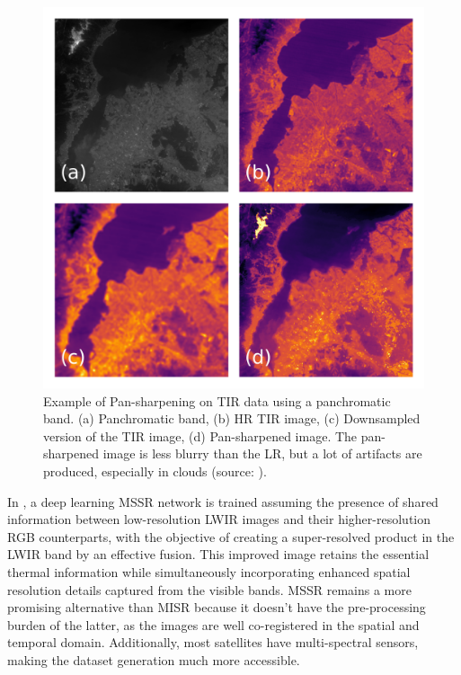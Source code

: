         \begin{figure}[H]
            \centering
            \includegraphics[scale=0.9]{Includes/2-pansharpen.png}
            \caption{Example of Pan-sharpening on TIR data using a panchromatic band. (a) Panchromatic band, (b) HR TIR image, (c) Downsampled version of the TIR image, (d) Pan-sharpened image. 
            The pan-sharpened image is less blurry than the LR, but a lot of artifacts are produced, especially in clouds (source: \cite{myself2023}).}
            \label{fig:2-pansharpening}
        \end{figure}

        In \cite{myself2023}, a deep learning MSSR network is trained assuming the presence of shared information between low-resolution LWIR images and their higher-resolution RGB counterparts, with the objective of creating a super-resolved product in the LWIR band by an effective fusion. This improved image retains the essential thermal information while simultaneously incorporating enhanced spatial resolution details captured from the visible bands. 
        MSSR remains a more promising alternative than MISR because it doesn't have the pre-processing burden of the latter, as the images are well co-registered in the spatial and temporal domain.
        Additionally, most satellites have multi-spectral sensors, making the dataset generation much more accessible.

